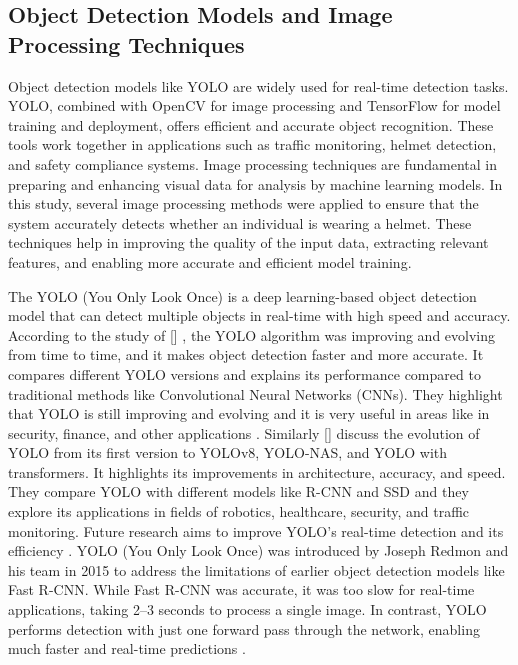 \begin{refsection}
{\subsection{Object Detection Models and Image Processing Techniques}

    Object detection models like YOLO are widely used for real-time detection tasks. YOLO, combined with OpenCV for image processing and TensorFlow for model training and deployment, offers efficient and accurate object recognition. These tools work together in applications such as traffic monitoring, helmet detection, and safety compliance systems.  Image processing techniques are fundamental in preparing and enhancing visual data for analysis by machine learning models. In this study, several image processing methods were applied to ensure that the system accurately detects whether an individual is wearing a helmet. These techniques help in improving the quality of the input data, extracting relevant features, and enabling more accurate and efficient model training.

    The YOLO (You Only Look Once) is a deep learning-based object detection model that can detect multiple objects in real-time with high speed and accuracy. According to the study of \citeauthor{jiang2022review} [\citeyear{jiang2022review}] , the YOLO algorithm was improving and evolving from time to time, and it makes object detection faster and more accurate. It compares different YOLO versions and explains its performance compared to traditional methods like Convolutional Neural Networks (CNNs). They highlight that YOLO is still improving and evolving and it is very useful in areas like in security, finance, and other applications \cite{jiang2022review}. Similarly \citeauthor{terven2022comprehensive} [\citeyear{terven2022comprehensive}] discuss the evolution of YOLO from its first version to YOLOv8, YOLO-NAS, and YOLO with transformers. It highlights its improvements in architecture, accuracy, and speed. They compare YOLO with different models like R-CNN and SSD and they explore its applications in fields of robotics, healthcare, security, and traffic monitoring. Future research aims to improve YOLO’s real-time detection and its efficiency \cite{terven2022comprehensive}. YOLO (You Only Look Once) was introduced by Joseph Redmon and his team in 2015 to address the limitations of earlier object detection models like Fast R-CNN. While Fast R-CNN was accurate, it was too slow for real-time applications, taking 2–3 seconds to process a single image. In contrast, YOLO performs detection with just one forward pass through the network, enabling much faster and real-time predictions \cite{gfg2021yolo}.

}
\end{refsection}

